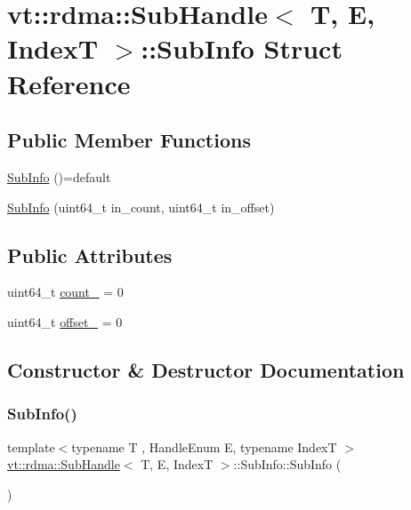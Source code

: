 \hypertarget{structvt_1_1rdma_1_1_sub_handle_1_1_sub_info}{}\section{vt\+:\+:rdma\+:\+:Sub\+Handle$<$ T, E, IndexT $>$\+:\+:Sub\+Info Struct Reference}
\label{structvt_1_1rdma_1_1_sub_handle_1_1_sub_info}
\subsection*{Public Member Functions}
\begin{DoxyCompactItemize}
\item 
\hyperlink{structvt_1_1rdma_1_1_sub_handle_1_1_sub_info_a997667045b7ad0ae8dc0e65fd5d663c0}{Sub\+Info} ()=default
\item 
\hyperlink{structvt_1_1rdma_1_1_sub_handle_1_1_sub_info_a8d1dc8ee4d81e50e07d2f4733b6e4932}{Sub\+Info} (uint64\+\_\+t in\+\_\+count, uint64\+\_\+t in\+\_\+offset)
\end{DoxyCompactItemize}
\subsection*{Public Attributes}
\begin{DoxyCompactItemize}
\item 
uint64\+\_\+t \hyperlink{structvt_1_1rdma_1_1_sub_handle_1_1_sub_info_a44ea9e215bc2f41221f9cb00534f9e2c}{count\+\_\+} = 0
\item 
uint64\+\_\+t \hyperlink{structvt_1_1rdma_1_1_sub_handle_1_1_sub_info_ad17c69011f4b421af9fc7e89fe95efe3}{offset\+\_\+} = 0
\end{DoxyCompactItemize}


\subsection{Constructor \& Destructor Documentation}
\mbox{\label{structvt_1_1rdma_1_1_sub_handle_1_1_sub_info_a997667045b7ad0ae8dc0e65fd5d663c0}} 
\subsubsection{\texorpdfstring{Sub\+Info()}{SubInfo()}\hspace{0.1cm}{\footnotesize\ttfamily [1/2]}}
{\footnotesize\ttfamily template$<$typename T , Handle\+Enum E, typename IndexT $>$ \\
\hyperlink{structvt_1_1rdma_1_1_sub_handle}{vt\+::rdma\+::\+Sub\+Handle}$<$ T, E, IndexT $>$\+::Sub\+Info\+::\+Sub\+Info (\begin{DoxyParamCaption}{ }\end{DoxyParamCaption})\hspace{0.3cm}{\ttfamily [default]}}

